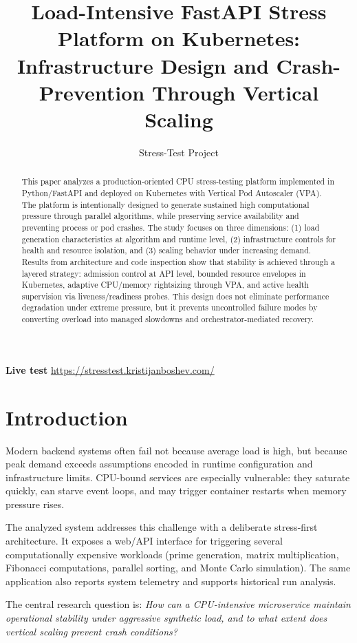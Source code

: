 \documentclass[11pt,a4paper]{article}
\title{Load-Intensive FastAPI Stress Platform on Kubernetes:\\
Infrastructure Design and Crash-Prevention Through Vertical Scaling}
\author{Stress-Test Project}
\begin{document}
\maketitle

\textbf{Live test} \url{https://stresstest.kristijanboshev.com/}

\begin{abstract}
This paper analyzes a production-oriented CPU stress-testing platform implemented in Python/FastAPI and deployed on Kubernetes with Vertical Pod Autoscaler (VPA). The platform is intentionally designed to generate sustained high computational pressure through parallel algorithms, while preserving service availability and preventing process or pod crashes. The study focuses on three dimensions: (1) load generation characteristics at algorithm and runtime level, (2) infrastructure controls for health and resource isolation, and (3) scaling behavior under increasing demand. Results from architecture and code inspection show that stability is achieved through a layered strategy: admission control at API level, bounded resource envelopes in Kubernetes, adaptive CPU/memory rightsizing through VPA, and active health supervision via liveness/readiness probes. This design does not eliminate performance degradation under extreme pressure, but it prevents uncontrolled failure modes by converting overload into managed slowdowns and orchestrator-mediated recovery.
\end{abstract}

\section{Introduction}
Modern backend systems often fail not because average load is high, but because peak demand exceeds assumptions encoded in runtime configuration and infrastructure limits. CPU-bound services are especially vulnerable: they saturate quickly, can starve event loops, and may trigger container restarts when memory pressure rises.

The analyzed system addresses this challenge with a deliberate stress-first architecture. It exposes a web/API interface for triggering several computationally expensive workloads (prime generation, matrix multiplication, Fibonacci computations, parallel sorting, and Monte Carlo simulation). The same application also reports system telemetry and supports historical run analysis.

The central research question is: \emph{How can a CPU-intensive microservice maintain operational stability under aggressive synthetic load, and to what extent does vertical scaling prevent crash conditions?}
\end{document}
